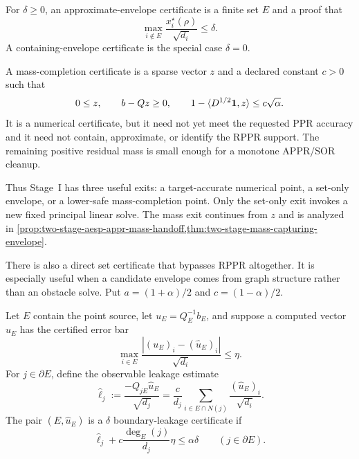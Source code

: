 \begin{definition}
\label{def:two-stage-approximate-envelope}
For $\delta\geq0$, an approximate-envelope certificate is a finite set $E$
and a proof that
\begin{equation}
 \max_{i\notin E}\frac{x_i^\star(\rho)}{\sqrt{d_i}}\leq\delta.
 \label{eq:two-stage-approximate-envelope}
\end{equation}
A containing-envelope certificate is the special case $\delta=0$.
\end{definition}

\begin{definition}
\label{def:two-stage-mass-certificate}
A mass-completion certificate is a sparse vector $z$ and a declared constant
$c>0$ such that
\begin{equation}
 0\leq z,\qquad b-Qz\geq0,\qquad
 1-\langle D^{1/2}\mathbf{1},z\rangle\leq c\sqrt\alpha.
 \label{eq:two-stage-mass-certificate}
\end{equation}
It is a numerical certificate, but it need not yet meet the requested PPR
accuracy and it need not contain, approximate, or identify the RPPR support.
The remaining positive residual mass is small enough for a monotone
APPR/SOR cleanup.
\end{definition}

Thus Stage~I has three useful exits: a target-accurate numerical point, a
set-only envelope, or a lower-safe mass-completion point.  Only the set-only
exit invokes a new fixed principal linear solve.  The mass exit continues
from $z$ and is analyzed in
\cref{prop:two-stage-aesp-appr-mass-handoff,thm:two-stage-mass-capturing-envelope}.

There is also a direct set certificate that bypasses RPPR altogether.  It is
especially useful when a candidate envelope comes from graph structure rather
than an obstacle solve.  Put $a=(1+\alpha)/2$ and
$c=(1-\alpha)/2$.

\begin{definition}
\label{def:two-stage-leakage-certificate}
Let $E$ contain the point source, let $u_E=Q_E^{-1}b_E$, and suppose a
computed vector $\widehat u_E$ has the certified error bar
\begin{equation}
 \max_{i\in E}
 \frac{|(u_E)_i-(\widehat u_E)_i|}{\sqrt{d_i}}
 \leq\eta.
 \label{eq:two-stage-leakage-error-bar}
\end{equation}
For $j\in\partial E$, define the observable leakage estimate
\begin{equation}
 \widehat\ell_j
 :=\frac{-Q_{jE}\widehat u_E}{\sqrt{d_j}}
 =\frac{c}{d_j}
   \sum_{i\in E\cap N(j)}
   \frac{(\widehat u_E)_i}{\sqrt{d_i}}.
 \label{eq:two-stage-observed-leakage}
\end{equation}
The pair $(E,\widehat u_E)$ is a $\delta$ boundary-leakage certificate if
\begin{equation}
 \widehat\ell_j
 +c\frac{\deg_E(j)}{d_j}\eta
 \leq\alpha\delta
 \qquad(j\in\partial E).
 \label{eq:two-stage-leakage-gate}
\end{equation}
\end{definition}

